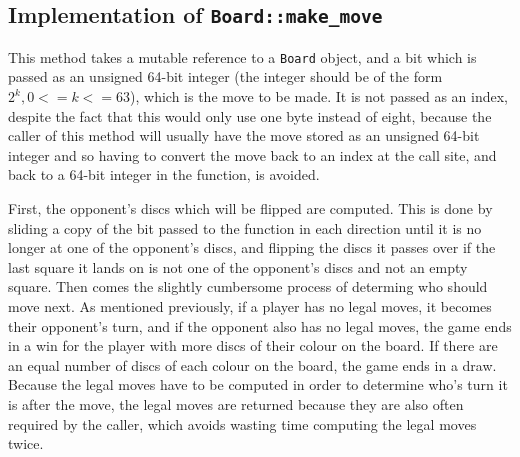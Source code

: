 \documentclass[12pt, a4paper]{report}
\begin{document}
\subsection{Implementation of \texttt{Board::make\_move}}
This method takes a mutable reference to a \texttt{Board} object, and a bit which is passed as an unsigned 64-bit integer (the integer should be of the form \(2^k, 0 <= k <= 63\)), 
which is the move to be made. It is not passed as an index, despite the fact that this would only use one byte instead of eight, because the caller of this method will usually have the move stored as an unsigned 64-bit 
integer and so having to convert the move back to an index at the call site, and back to a 64-bit integer in the function, is avoided.

First, the opponent's discs which will be flipped are computed. This is done by sliding a copy of the bit passed to the function in each direction until it is no longer at one of the opponent's discs, 
and flipping the discs it passes over if the last square it lands on is not one of the opponent's discs and not an empty square. Then comes the slightly cumbersome process of determing who should move next.
As mentioned previously, if a player has no legal moves, it becomes their opponent's turn, and if the opponent also has no legal moves, the game ends in a win for the player with more discs of their colour on the board.
If there are an equal number of discs of each colour on the board, the game ends in a draw. Because the legal moves have to be computed in order to determine who's turn it is after the move, the legal moves are returned 
because they are also often required by the caller, which avoids wasting time computing the legal moves twice.
\end{document}
